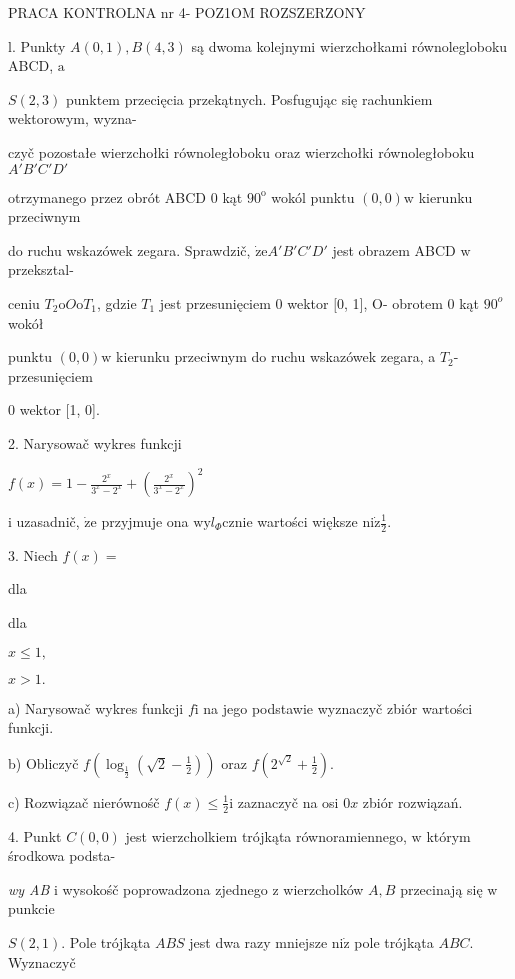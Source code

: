 \documentclass[a4paper,12pt]{article}
\begin{document}
PRACA KONTROLNA nr 4- POZ1OM ROZSZERZONY

l. Punkty $A(0,1), B(4,3)$ są dwoma kolejnymi wierzchołkami równolegloboku ABCD, $\mathrm{a}$

$S(2,3)$ punktem przecięcia przekątnych. Posfugując się rachunkiem wektorowym, wyzna-

czyč pozostałe wierzchołki równoległoboku oraz wierzchołki równoległoboku $A'B'C'D'$

otrzymanego przez obrót ABCD $0$ kąt $90^{\mathrm{o}}$ wokól punktu $(0,0)\mathrm{w}$ kierunku przeciwnym

do ruchu wskazówek zegara. Sprawdzič, $\dot{\mathrm{z}}\mathrm{e}A'B'C'D'$ jest obrazem ABCD $\mathrm{w}$ przeksztal-

ceniu $T_{2}\mathrm{o}O\mathrm{o}T_{1}$, gdzie $T_{1}$ jest przesunięciem $0$ wektor $[0$, 1$]$, O- obrotem $0$ kąt $90^{o}$ wokół

punktu $(0,0)\mathrm{w}$ kierunku przeciwnym do ruchu wskazówek zegara, a $T_{2}$- przesunięciem

$0$ wektor [1, 0].

2. Narysowač wykres funkcji

$f(x)=1-\displaystyle \frac{2^{x}}{3^{x}-2^{x}}+(\frac{2^{x}}{3^{x}-2^{x}})^{2}$

$\mathrm{i}$ uzasadnič, $\dot{\mathrm{z}}\mathrm{e}$ przyjmuje ona $\mathrm{w}\mathrm{y}l_{\Phi}$cznie wartości większe $\displaystyle \mathrm{n}\mathrm{i}\dot{\mathrm{z}}\frac{1}{2}.$

3. Niech $f(x)=$

dla

dla

$x\leq 1,$

$x>1.$

a) Narysowač wykres funkcji $f\mathrm{i}$ na jego podstawie wyznaczyč zbiór wartości funkcji.

b) Obliczyč $f(\displaystyle \log_{\frac{1}{2}}(\sqrt{2}-\frac{1}{2}))$ oraz $f(2^{\sqrt{2}}+\displaystyle \frac{1}{2}).$

c) Rozwiązač nierównośč $f(x)\displaystyle \leq\frac{1}{2}\mathrm{i}$ zaznaczyč na osi $0x$ zbiór rozwiązań.

4. Punkt $C(0,0)$ jest wierzcholkiem trójkąta równoramiennego, $\mathrm{w}$ którym środkowa podsta-

{\it wy AB} $\mathrm{i}$ wysokośč poprowadzona zjednego $\mathrm{z}$ wierzcholków $A, B$ przecinają się $\mathrm{w}$ punkcie

$S(2,1)$. Pole trójkąta $ABS$ jest dwa razy mniejsze $\mathrm{n}\mathrm{i}\dot{\mathrm{z}}$ pole trójkąta $ABC$. Wyznaczyč
\end{document}
